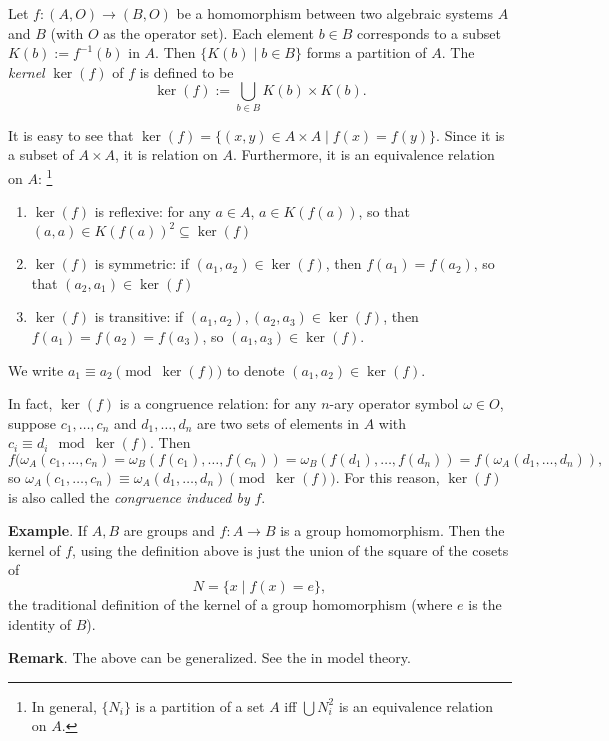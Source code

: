 \documentclass[12pt]{article}
\begin{document}
Let $f:(A,O)\to (B,O)$ be a homomorphism between two algebraic systems $A$ and $B$ (with $O$ as the operator set).  Each element $b\in B$ corresponds to a subset $K(b):=f^{-1}(b)$ in $A$.  Then $\lbrace K(b)\mid b\in B\rbrace$ forms a partition of $A$.  The \emph{kernel} $\ker(f)$ of $f$ is defined to be 
$$\ker(f):=\bigcup_{b\in B}K(b)\times K(b).$$

It is easy to see that $\ker(f)=\lbrace (x,y)\in A\times A\mid f(x)=f(y)\rbrace$.  Since it is a subset of $A\times A$, it is relation on $A$.  Furthermore, it is an equivalence relation on $A$:
{\footnote{In general, $\lbrace N_i\rbrace$ is a partition of a set $A$ iff $\bigcup N_i^2$ is an equivalence relation on $A$.}}

\begin{enumerate}
\item $\ker(f)$ is reflexive: for any $a\in A$, $a\in K(f(a))$, so that $(a,a)\in K(f(a))^2\subseteq \ker(f)$
\item $\ker(f)$ is symmetric: if $(a_1,a_2)\in \ker(f)$, then $f(a_1)=f(a_2)$, so that $(a_2,a_1)\in \ker(f)$
\item $\ker(f)$ is transitive: if $(a_1,a_2),(a_2,a_3)\in \ker(f)$, then $f(a_1)=f(a_2)=f(a_3)$, so $(a_1,a_3)\in \ker(f)$.
\end{enumerate}

We write $a_1 \equiv a_2 \pmod {\ker(f)}$ to denote $(a_1,a_2)\in \ker(f)$. 

In fact, $\ker(f)$ is a congruence relation: for any $n$-ary operator symbol $\omega\in O$, suppose $c_1,\ldots,c_n$ and $d_1,\ldots,d_n$ are two sets of elements in $A$ with $c_i\equiv d_i \mod \ker(f)$.  Then $$f(\omega_A(c_1,\ldots,c_n) = \omega_B(f(c_1),\ldots,f(c_n))=\omega_B(f(d_1),\ldots,f(d_n)) = f(\omega_A(d_1,\ldots,d_n)),$$ so $\omega_A(c_1,\ldots,c_n)\equiv \omega_A(d_1,\ldots,d_n) \pmod {\ker(f)}$.  For this reason, $\ker(f)$ is also called the \emph{congruence induced by} $f$.

\textbf{Example}.  If $A,B$ are groups and $f:A\to B$ is a group homomorphism.  Then the kernel of $f$, using the definition above is just the union of the square of the cosets of $$N=\lbrace x\mid f(x)=e\rbrace,$$ the traditional definition of the kernel of a group homomorphism (where $e$ is the identity of $B$).

\textbf{Remark}.  The above can be generalized.  See the  in model theory.
\end{document}
